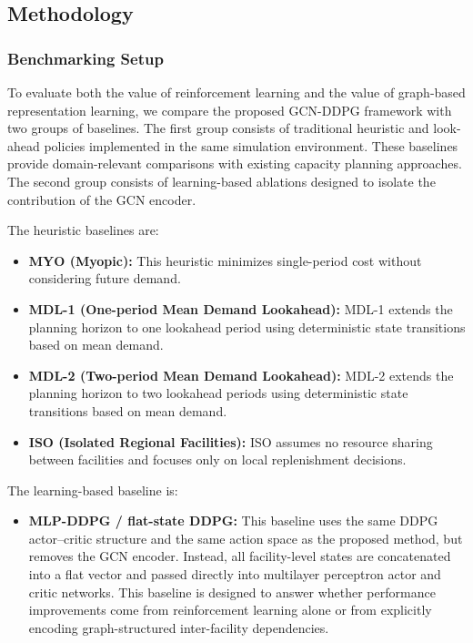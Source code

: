 \documentclass[preprint,review,12pt,nonatbib]{elsarticle}
\begin{document}
\subsection{Methodology}

\subsubsection{Benchmarking Setup}
To evaluate both the value of reinforcement learning and the value of graph-based representation learning, we compare the proposed GCN-DDPG framework with two groups of baselines. The first group consists of traditional heuristic and look-ahead policies implemented in the same simulation environment. These baselines provide domain-relevant comparisons with existing capacity planning approaches. The second group consists of learning-based ablations designed to isolate the contribution of the GCN encoder.

The heuristic baselines are:
\begin{itemize}
\item \textbf{MYO (Myopic):} This heuristic minimizes single-period cost without considering future demand.
\item \textbf{MDL-1 (One-period Mean Demand Lookahead):} MDL-1 extends the planning horizon to one lookahead period using deterministic state transitions based on mean demand.
\item \textbf{MDL-2 (Two-period Mean Demand Lookahead):} MDL-2 extends the planning horizon to two lookahead periods using deterministic state transitions based on mean demand.
\item \textbf{ISO (Isolated Regional Facilities):} ISO assumes no resource sharing between facilities and focuses only on local replenishment decisions.
\end{itemize}

The learning-based baseline is:
\begin{itemize}
\item \textbf{MLP-DDPG / flat-state DDPG:} This baseline uses the same DDPG actor--critic structure and the same action space as the proposed method, but removes the GCN encoder. Instead, all facility-level states are concatenated into a flat vector and passed directly into multilayer perceptron actor and critic networks. This baseline is designed to answer whether performance improvements come from reinforcement learning alone or from explicitly encoding graph-structured inter-facility dependencies.
\end{itemize}
\end{document}
